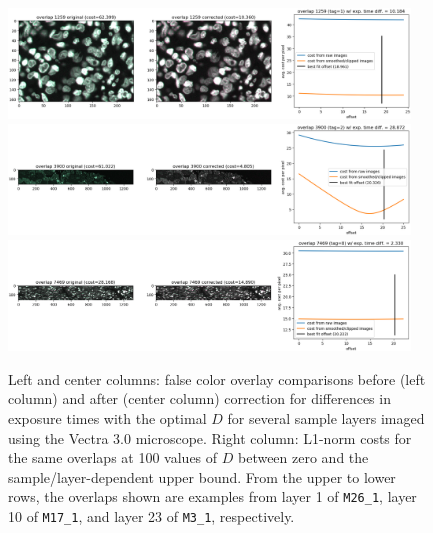 \documentclass[letterpaper,11pt]{article}
\begin{document}
\begin{figure}[!ht]
\centering
\includegraphics[width=0.95\textwidth]{images/methods/cost_examples_vectra/overlay_comp_random_6761_offset=18.961}
\includegraphics[width=0.95\textwidth]{images/methods/cost_examples_vectra/overlay_comp_random_2425_offset=20.326}
\includegraphics[width=0.95\textwidth]{images/methods/cost_examples_vectra/overlay_comp_random_3946_offset=20.222}
\caption{\footnotesize Left and center columns: false color overlay comparisons before (left column) and after (center column) correction for differences in exposure times with the optimal $D$ for several sample layers imaged using the Vectra 3.0 microscope. Right column: L1-norm costs for the same overlaps at 100 values of $D$ between zero and the sample/layer-dependent upper bound. From the upper to lower rows, the overlaps shown are examples from layer 1 of \texttt{M26\_1}, layer 10 of \texttt{M17\_1}, and layer 23 of \texttt{M3\_1}, respectively.}
\label{fig:overlap_cost_examples_vectra_1}
\end{figure}
\end{document}
